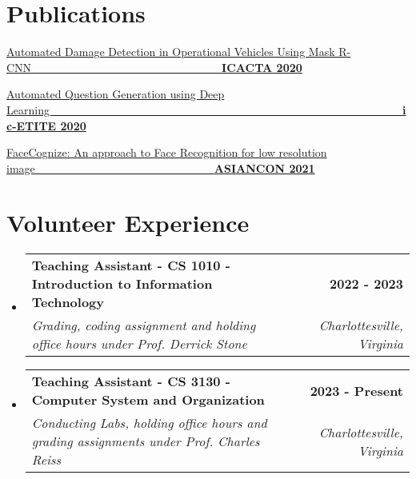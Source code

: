 \documentclass[a4paper,20pt]{article}
\makeatletter
\newcommand{\resumeSubheading}[4]{
  \vspace{-1pt}\item
    \begin{tabular*}{0.97\textwidth}{l@{\extracolsep{\fill}}r}
      \textbf{#1} & \textbf{#2} \\
      \textit{#3} & \textit{#4} \\
    \end{tabular*}\vspace{-5pt}
}
\newcommand{\resumeSubHeadingListStart}{\begin{itemize}[leftmargin=*]}
\newcommand{\resumeSubHeadingListEnd}{\end{itemize}}
\makeatother
\begin{document}
\section{Publications}
\begin{description}[font=$\bullet$]
\item \href{https://link.springer.com/chapter/10.1007/978-981-15-3242-9_54}{Automated Damage Detection in Operational Vehicles Using Mask R-CNN~~~~~~~~~~~~~~~~~~~~~~~~~~~~~~~~~~\textbf{ICACTA 2020}}
\vspace{-5pt}
\item \href{https://ieeexplore.ieee.org/abstract/document/9077721}{Automated Question Generation using Deep Learning~~~~~~~~~~~~~~~~~~~~~~~~~~~~~~~~~~~~~~~~~~~~~~~~~~~~~~~~~~~~~~~\textbf{ic-ETITE 2020}}
\vspace{-5pt}
\item \href{https://ieeexplore.ieee.org/document/9544851}{FaceCognize: An approach to Face Recognition for low resolution image~~~~~~~~~~~~~~~~~~~~~~~~~~~~~~~~\textbf{ASIANCON 2021}}
\vspace{-5pt}



\end{description}
\vspace{2pt}


\vspace{-5pt}
\section{Volunteer Experience}
  \resumeSubHeadingListStart
	\resumeSubheading
    {Teaching Assistant - CS 1010 - Introduction to Information Technology}{2022 - 2023}
    {Grading, coding assignment and holding office hours under Prof. Derrick Stone}{Charlottesville, Virginia}
\resumeSubheading
    {Teaching Assistant - CS 3130 - Computer System and Organization}{2023 - Present}
    {Conducting Labs, holding office hours and grading assignments under Prof. Charles Reiss}{Charlottesville, Virginia}
\resumeSubHeadingListEnd
\end{document}

